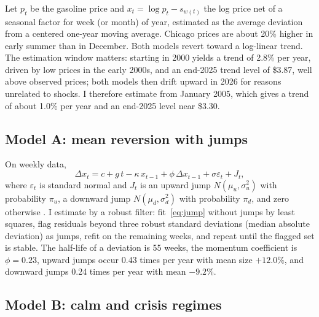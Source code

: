 \documentclass[11pt]{article}
\begin{document}
Let $p_t$ be the gasoline price and $x_t = \log p_t - s_{w(t)}$ the log price net of a seasonal factor for week (or month) of year, estimated as the average deviation from a centered one-year moving average. Chicago prices are about 20\% higher in early summer than in December. Both models revert toward a log-linear trend. The estimation window matters: starting in 2000 yields a trend of 2.8\% per year, driven by low prices in the early 2000s, and an end-2025 trend level of \$3.87, well above observed prices; both models then drift upward in 2026 for reasons unrelated to shocks. I therefore estimate from January 2005, which gives a trend of about 1.0\% per year and an end-2025 level near \$3.30.

\subsection{Model A: mean reversion with jumps}

On weekly data,
\begin{equation}\label{eq:jump}
\Delta x_t = c + g\,t - \kappa\, x_{t-1} + \phi\, \Delta x_{t-1} + \sigma \varepsilon_t + J_t,
\end{equation}
where $\varepsilon_t$ is standard normal and $J_t$ is an upward jump $N(\mu_u,\sigma_u^2)$ with probability $\pi_u$, a downward jump $N(\mu_d,\sigma_d^2)$ with probability $\pi_d$, and zero otherwise \citep{merton1976,schwartz1997}. I estimate by a robust filter: fit~\eqref{eq:jump} without jumps by least squares, flag residuals beyond three robust standard deviations (median absolute deviation) as jumps, refit on the remaining weeks, and repeat until the flagged set is stable. The half-life of a deviation is 55 weeks, the momentum coefficient is $\phi = 0.23$, upward jumps occur 0.43 times per year with mean size $+12.0\%$, and downward jumps 0.24 times per year with mean $-9.2\%$.

\subsection{Model B: calm and crisis regimes}
\end{document}
